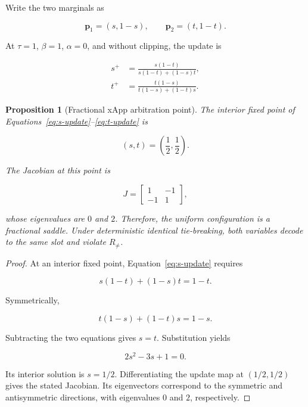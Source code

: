 \documentclass[pdflatex,sn-mathphys-num,iicol,oneside]{sn-jnl}
\newtheorem{proposition}{Proposition}
\begin{document}
Write the two marginals as

\begin{equation}
\bm{p}_1=(s,1-s),
\qquad
\bm{p}_2=(t,1-t).
\end{equation}

At $\tau=1$, $\beta=1$, $\alpha=0$, and without clipping, the update is

\begin{align}
s^{+}
&=
\frac{s(1-t)}
{s(1-t)+(1-s)t},
\label{eq:s-update}
\\
t^{+}
&=
\frac{t(1-s)}
{t(1-s)+(1-t)s}.
\label{eq:t-update}
\end{align}

\begin{proposition}[Fractional xApp arbitration point]
The interior fixed point of
Equations~\eqref{eq:s-update}--\eqref{eq:t-update} is

\begin{equation}
(s,t)=\left(\frac{1}{2},\frac{1}{2}\right).
\end{equation}

The Jacobian at this point is

\begin{equation}
J=
\begin{bmatrix}
1 & -1\\
-1 & 1
\end{bmatrix},
\end{equation}

whose eigenvalues are $0$ and $2$. Therefore, the uniform
configuration is a fractional saddle. Under deterministic identical
tie-breaking, both variables decode to the same slot and violate
$R_{\neq}$.
\end{proposition}

\begin{proof}
At an interior fixed point,
Equation~\eqref{eq:s-update} requires

\begin{equation}
s(1-t)+(1-s)t=1-t.
\end{equation}

Symmetrically,

\begin{equation}
t(1-s)+(1-t)s=1-s.
\end{equation}

Subtracting the two equations gives $s=t$. Substitution yields

\begin{equation}
2s^2-3s+1=0.
\end{equation}

Its interior solution is $s=1/2$. Differentiating the update map at
$(1/2,1/2)$ gives the stated Jacobian. Its eigenvectors correspond to
the symmetric and antisymmetric directions, with eigenvalues $0$ and
$2$, respectively.
\end{proof}
\end{document}
